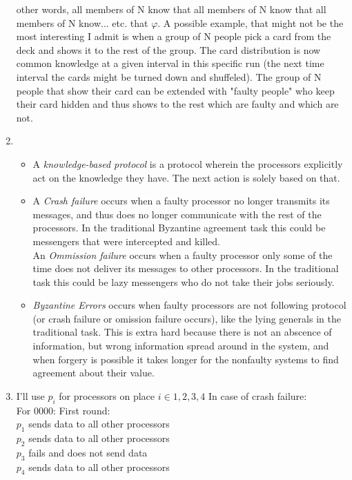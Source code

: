\documentclass[12pt]{article} %
\begin{document}
\begin{enumerate}
        other words, all members of N know that all members of N know that all
        members of N know... etc. that $\varphi$. A possible example, that might
        not be the most interesting I admit is when a group of N people pick a
        card from the deck and shows it to the rest of the group. The card
        distribution is now common knowledge at a given interval in this
        specific run (the next time interval the cards might be turned down and
        shuffeled). The group of N people that show their card can be extended
        with "faulty people" who keep their card hidden and thus shows to the
        rest which are faulty and which are not.
    \item 
        \begin{itemize}
            \item A \emph{knowledge-based protocol} is a protocol wherein the
                processors explicitly act on the knowledge they have. The next
                action is solely based on that.
            \item A \emph{Crash failure} occurs when a faulty processor no
                longer transmits its messages, and thus does no longer
                communicate with the rest of the processors. In the traditional Byzantine
                agreement task this could be messengers that were intercepted
                and killed.\\
                An \emph{Ommission failure} occurs when a faulty processor only
                some of the time does not deliver its messages to other
                processors. In the traditional task this could be lazy
                messengers who do not take their jobs seriously.
            \item \emph{Byzantine Errors} occurs when faulty processors are not
                following protocol (or crash failure or omission failure occurs),
                like the lying generals in the traditional
                task. This is extra hard because there is not an abscence of
                information, but wrong information spread around in the system,
                and when forgery is possible it takes longer for the nonfaulty
                systems to find agreement about their value.
        \end{itemize}
    \item I'll use $p_i$ for processors on place $i \in {1, 2, 3, 4}$
        In case of crash failure:\\
        For 0000:
        First round:\\
        $p_1$ sends data to all other processors\\
        $p_2$ sends data to all other processors\\
        $p_3$ fails and does not send data\\
        $p_4$ sends data to all other processors\\
        

\end{enumerate}
\end{document}

